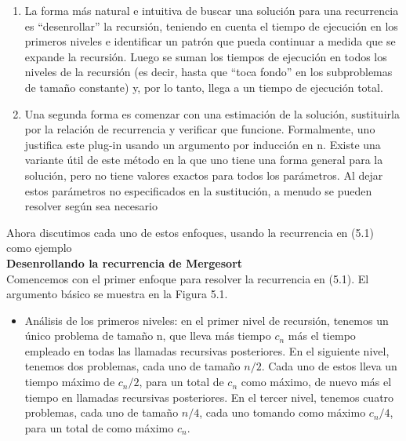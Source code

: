 \documentclass[a4paper, 12pt]{book}
\theoremstyle{dotless}
\begin{document}
\begin{enumerate}
\item La forma más natural e intuitiva de buscar una solución para una recurrencia es ``desenrollar'' la recursión, teniendo en cuenta el tiempo de ejecución en los primeros niveles e identificar un patrón que pueda continuar a medida que se expande la recursión. Luego se suman los tiempos de ejecución en todos los niveles de la recursión (es decir, hasta que ``toca fondo'' en los subproblemas de tamaño constante) y, por lo tanto, llega a un tiempo de ejecución total.

\item  Una segunda forma es comenzar con una estimación de la solución, sustituirla por la relación de recurrencia y verificar que funcione. Formalmente, uno justifica este plug-in usando un argumento por inducción en n. Existe una variante útil de este método en la que uno tiene una forma general para la solución, pero no tiene valores exactos para todos los parámetros. Al dejar estos parámetros no especificados en la sustitución, a menudo se pueden resolver según sea necesario
\end{enumerate}
    
Ahora discutimos cada uno de estos enfoques, usando la recurrencia en (5.1) como ejemplo\\
    
\textbf{Desenrollando la recurrencia de Mergesort} \\

Comencemos con el primer enfoque para resolver la recurrencia en (5.1). El argumento básico se muestra en la Figura 5.1.\\

\begin{itemize}

\item Análisis de los primeros niveles: en el primer nivel de recursión, tenemos un único problema de tamaño n, que lleva más tiempo $c_n$ más el tiempo empleado en todas las llamadas recursivas posteriores. En el siguiente nivel, tenemos dos problemas, cada uno de tamaño $n/2$. Cada uno de estos lleva un tiempo máximo de $c_n /2$, para un total de $c_n$ como máximo, de nuevo más el tiempo en llamadas recursivas posteriores. En el tercer nivel, tenemos cuatro problemas, cada uno de tamaño $n/4$, cada uno tomando como máximo $c_n/4$, para un total de como máximo $c_n$.    

\end{itemize}
\end{document}
